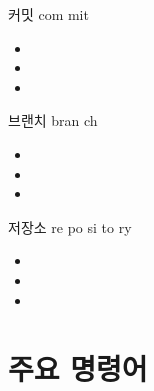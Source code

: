 \documentclass[aspectratio=1610,20pt,xcolor=pdftex,dvipsnames,table,handout]{beamer}
\begin{document}
		\begin{frame} [t,plain]

			\begin{block} { 커밋 com mit }
			\setlength{\leftmargini}{1em}			
			\begin{itemize}
				\item 	
				\item 	
				\item 	
			\end{itemize}
			\end{block}						

		\end{frame}						



		\begin{frame} [t,plain]

			\begin{block} {브랜치 bran ch }
			\setlength{\leftmargini}{1em}			
			\begin{itemize}
				\item 	
				\item 	
				\item 	
			\end{itemize}
			\end{block}						

		\end{frame}						

		\begin{frame} [t,plain]

			\begin{block} { 저장소 re po si to ry }
			\setlength{\leftmargini}{1em}			
			\begin{itemize}
				\item 	
				\item 	
				\item 	
			\end{itemize}
			\end{block}						

		\end{frame}						


		\part{주요 명령어}
		\frame{\partpage}
\end{document}
